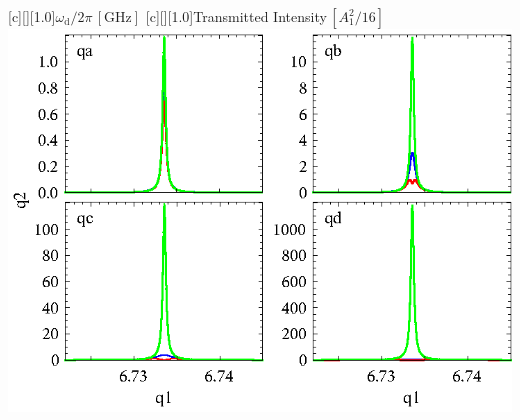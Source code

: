 

 \figstyle
 [c][][1.0]{$\omega_\text{d}/2\pi\,[\text{GHz}]$}
 [c][][1.0]{Transmitted Intensity\,$[A_1^2/16]$}
 \includegraphics[height=\bigheight]{lnrvsnonlnr.eps}

